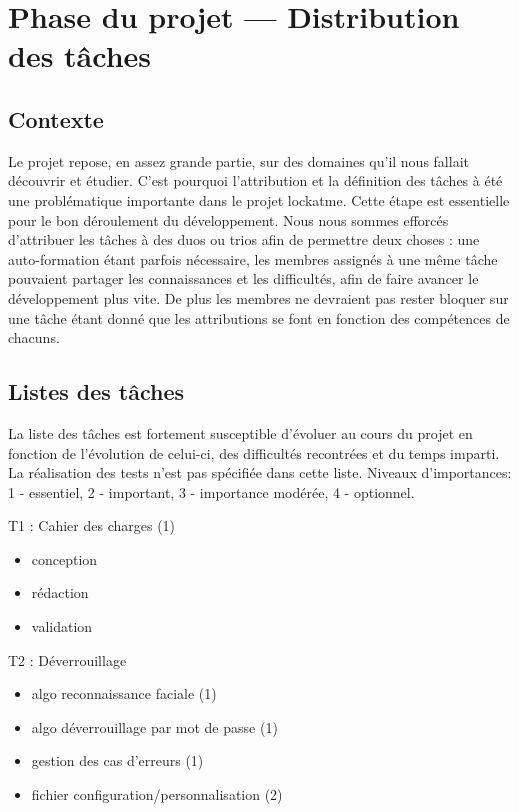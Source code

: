 \chapter{Phase du projet --- Distribution des tâches}
\newpage

\section{Contexte}
Le projet repose, en assez grande partie, sur des domaines qu’il nous
fallait découvrir et étudier. C’est pourquoi l’attribution et la définition
des tâches à été une problématique importante dans le projet lockatme.
Cette étape est essentielle pour le bon déroulement du développement.
Nous nous sommes efforcés d’attribuer les tâches à des duos ou trios afin de
permettre deux choses : une auto-formation étant parfois nécessaire, les
membres assignés à une même tâche pouvaient partager les connaissances et les
difficultés, afin de faire avancer le développement plus vite. De plus les
membres ne devraient pas rester bloquer sur une tâche étant donné que les
attributions se font en fonction des compétences de chacuns.

\section{Listes des tâches}
La liste des tâches est fortement susceptible d’évoluer au cours du projet en
fonction de l’évolution de celui-ci, des difficultés recontrées et du temps
imparti. La réalisation des tests n’est pas spécifiée dans cette liste.
Niveaux d’importances: 1 - essentiel, 2 - important, 3 - importance modérée,
4 - optionnel.

\vspace{0.5cm}

T1 : Cahier des charges (1)
\begin{itemize}
  \item{conception}
  \item{rédaction}
  \item{validation}
\end{itemize}

T2 : Déverrouillage
\begin{itemize}
  \item{algo reconnaissance faciale (1)}
  \item{algo déverrouillage par mot de passe (1)}
  \item{gestion des cas d’erreurs (1)}
  \item{fichier configuration/personnalisation (2)}
\end{itemize}

